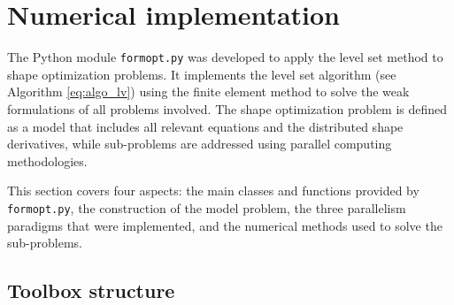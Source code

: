 \documentclass[iicol,pdflatex,sn-mathphys-ay]{sn-jnl}%
\theoremstyle{thmstyleone}%
\theoremstyle{thmstyletwo}%
\theoremstyle{thmstylethree}%
\begin{document}
\section{Numerical implementation}\label{sec:numerics}

The Python module \texttt{formopt.py} was developed to apply
the level set method to shape optimization problems.
It implements the level set algorithm (see Algorithm \ref{eq:algo_lv}) using
the finite element method to solve the weak formulations of all problems involved.
The shape optimization problem is defined as a model that includes
all relevant equations and the distributed shape derivatives,
while sub-problems are addressed using parallel computing methodologies.

This section covers four aspects:
the main classes and functions provided by \texttt{formopt.py},
the construction of the model problem,
the three parallelism paradigms that were implemented,
and the numerical methods used to solve the sub-problems.

\subsection{Toolbox structure}\label{sub:structure}
\end{document}

